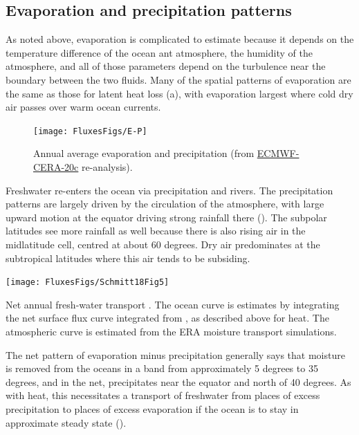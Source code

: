 \subsection{Evaporation and precipitation patterns}

As noted above, evaporation is complicated to estimate because it depends on the temperature difference of the ocean ant atmosphere, the humidity of the atmosphere, and all of those parameters depend on the turbulence near the boundary between the two fluids. Many of the spatial patterns of evaporation are the same as those for latent heat loss (a), with evaporation largest where cold dry air passes over warm ocean currents.


\begin{figure}
\begin{center}
\texttt{[image: FluxesFigs/E-P]}
 \caption{Annual average evaporation and precipitation (from \href{https://www.ecmwf.int/en/forecasts/datasets/reanalysis-datasets/cera-20c}{ECMWF-CERA-20c} re-analysis).  }
  \label{fig:E-P}
\end{center}
\end{figure}

Freshwater re-enters the ocean via precipitation and rivers.  The precipitation patterns are largely driven by the  circulation of the atmosphere, with large upward motion at the equator driving strong rainfall there ().  The subpolar latitudes see more rainfall as well because there is also rising air in the midlatitude cell, centred at about 60 degrees.  Dry air predominates at the subtropical latitudes where this air tends to be subsiding. 

\begin{marginfigure}
\begin{center}
\texttt{[image: FluxesFigs/Schmitt18Fig5]}
 \caption{Net annual fresh-water transport \citep[from][Fig.\ 5]{Schmitt18}.  The ocean curve is estimates by integrating the net surface flux curve integrated from , as described above for heat.  The atmospheric curve is estimated from the ERA moisture transport simulations.  }
  \label{fig:Schmitt18Fig5}
\end{center}
\end{marginfigure}

The net pattern of evaporation minus precipitation generally says that moisture is removed from the oceans in a band from approximately 5 degrees to 35 degrees, and in the net, precipitates near the equator and north of 40 degrees.  As with heat, this necessitates a transport of freshwater from places of excess precipitation to places of excess evaporation if the ocean is to stay in approximate steady state ().   


